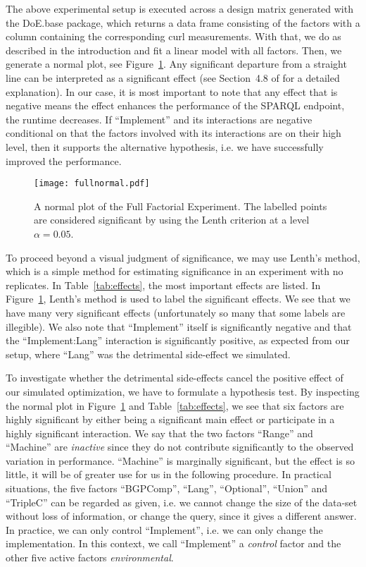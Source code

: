 \documentclass{llncs}
\begin{document}
The above experimental setup is executed across a design matrix
generated with the DoE.base package, which returns a data frame
consisting of the factors with a column containing the corresponding
curl measurements. With that, we do as described in the introduction
and fit a linear model with all factors. Then, we generate a normal
plot, see Figure~\ref{fig:fullnormal}.  Any significant departure from
a straight line can be interpreted as a significant effect (see
Section~4.8 of \cite{wu2009experiments} for a detailed
explanation). In our case, it is most important to note that any
effect that is negative means the effect enhances the performance of
the SPARQL endpoint, the runtime decreases. If ``Implement'' and its
interactions are negative conditional on that the factors involved
with its interactions are on their high level, then it supports the
alternative hypothesis, i.e. we have successfully improved the
performance.

\begin{figure}[t]
  \centerline{%
  \texttt{[image: fullnormal.pdf]}}
  \caption{A normal plot of the Full Factorial Experiment. The
    labelled points are considered significant by using the Lenth
    criterion at a level $\alpha=0.05$.}\label{fig:fullnormal}
\end{figure}


To proceed beyond a visual judgment of significance, we may use
Lenth's method\cite{lenthmethod}, which is a simple method for
estimating significance in an experiment with no replicates. In
Table~\ref{tab:effects}, the most important effects are listed.  In
Figure~\ref{fig:fullnormal}, Lenth's method is used to label the
significant effects. We see that we have many very significant effects
(unfortunately so many that some labels are illegible). We also note that
``Implement'' itself is significantly negative and that the
``Implement:Lang'' interaction is significantly positive, as expected
from our setup, where ``Lang'' was the detrimental side-effect we
simulated.


To investigate whether the detrimental side-effects cancel the
positive effect of our simulated optimization, we have to formulate a
hypothesis test. By inspecting the normal plot in
Figure~\ref{fig:fullnormal} and Table~\ref{tab:effects}, we see that
six factors are highly significant by either being a significant main
effect or participate in a highly significant interaction. We say that
the two factors ``Range'' and ``Machine'' are \emph{inactive} since
they do not contribute significantly to the observed variation in
performance. ``Machine'' is marginally significant, but the effect is
so little, it will be of greater use for us in the following procedure. In
practical situations, the five factors ``BGPComp'', ``Lang'',
``Optional'', ``Union'' and ``TripleC'' can be regarded as given,
i.e. we cannot change the size of the data-set without loss of
information, or change the query, since it gives a different
answer. In practice, we can only control ``Implement'', i.e. we can
only change the implementation. In this context, we call ``Implement''
a \emph{control} factor and the other five active factors
\emph{environmental}.
\end{document}

